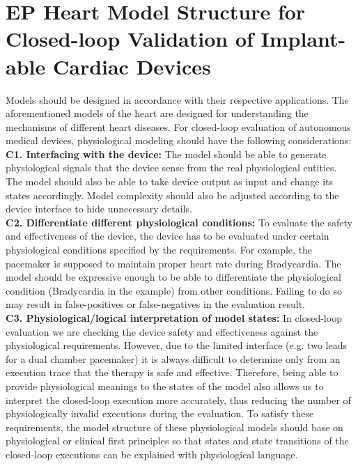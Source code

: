\section{EP Heart Model Structure for Closed-loop Validation of Implant-able Cardiac Devices}
Models should be designed in accordance with their respective applications. 
The aforementioned models of the heart are designed for understanding the mechanisms of different heart diseases. 
For closed-loop evaluation of autonomous medical devices, physiological modeling should have the following considerations:\\
\textbf{C1. Interfacing with the device: }The model should be able to generate physiological signals that the device sense from the real physiological entities. 
The model should also be able to take device output as input and change its states accordingly. 
Model complexity should also be adjusted according to the device interface to hide unnecessary details.\\
\textbf{C2. Differentiate different physiological conditions: }To evaluate the safety and effectiveness of the device, the device has to be evaluated under certain physiological conditions specified by the requirements. 
For example, the pacemaker is supposed to maintain proper heart rate during Bradycardia. 
The model should be expressive enough to be able to differentiate the physiological condition (Bradycardia in the example) from other conditions. 
Failing to do so may result in false-positives or false-negatives in the evaluation result. \\
\textbf{C3. Physiological/logical interpretation of model states: } In closed-loop evaluation we are checking the device safety and effectiveness against the physiological requirements. 
However, due to the limited interface (e.g. two leads for a dual chamber pacemaker) it is always difficult to determine only from an execution trace that the therapy is safe and effective. 
Therefore, being able to provide physiological meanings to the states of the model also allows us to interpret the closed-loop execution more accurately, thus reducing the number of physiologically invalid executions during the evaluation. 
To satisfy these requirements, the model structure of these physiological models should base on physiological or clinical first principles so that states and state transitions of the closed-loop executions can be explained with physiological language. \\%
